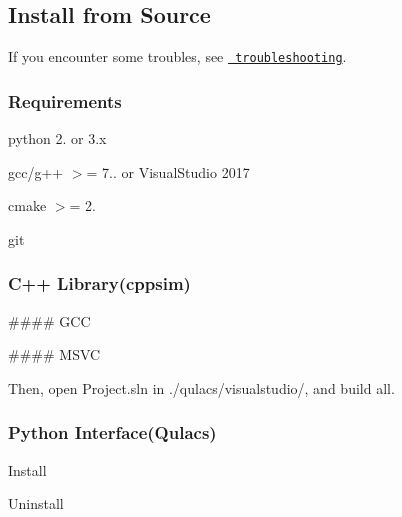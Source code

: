 \subsection*{Install from Source}

If you encounter some troubles, see \href{http://qulacs.org/md_4__trouble_shooting.html}{\texttt{ troubleshooting}}.

\subsubsection*{Requirements}


\begin{DoxyItemize}
\item python 2. or 3.\+x
\item gcc/g++ $>$= 7.. or Visual\+Studio 2017
\item cmake $>$= 2.
\item git
\end{DoxyItemize}

\subsubsection*{C++ Library(cppsim)}

\#\#\#\# G\+CC 
\begin{DoxyCode}{0}
\end{DoxyCode}


\#\#\#\# M\+S\+VC 
\begin{DoxyCode}{0}
\end{DoxyCode}
 Then, open {\ttfamily Project.\+sln} in {\ttfamily ./qulacs/visualstudio/}, and build all.

\subsubsection*{Python Interface(\+Qulacs)}

Install 
\begin{DoxyCode}{0}
\end{DoxyCode}


Uninstall 
\begin{DoxyCode}{0}
\end{DoxyCode}


